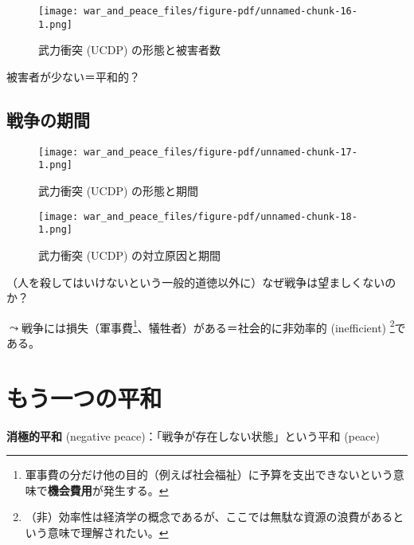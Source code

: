 \documentclass[
  xelatex,
  ja=standard]{bxjsarticle}
\begin{document}
\begin{figure}[htpb]

{\centering \texttt{[image: war\_and\_peace\_files/figure-pdf/unnamed-chunk-16-1.png]}

}

\caption{武力衝突 (UCDP) の形態と被害者数}

\end{figure}

被害者が少ない＝平和的？

\hypertarget{ux6226ux4e89ux306eux671fux9593}{%
\subsection{戦争の期間}\label{ux6226ux4e89ux306eux671fux9593}}

\begin{figure}[htpb]

{\centering \texttt{[image: war\_and\_peace\_files/figure-pdf/unnamed-chunk-17-1.png]}

}

\caption{武力衝突 (UCDP) の形態と期間}

\end{figure}

\begin{figure}[htpb]

{\centering \texttt{[image: war\_and\_peace\_files/figure-pdf/unnamed-chunk-18-1.png]}

}

\caption{武力衝突 (UCDP) の対立原因と期間}

\end{figure}

（人を殺してはいけないという一般的道徳以外に）なぜ戦争は望ましくないのか？

\(\leadsto\)戦争には損失（軍事費\footnote{軍事費の分だけ他の目的（例えば社会福祉）に予算を支出できないという意味で\textbf{機会費用}が発生する。}、犠牲者）がある＝社会的に非効率的
(inefficient) \footnote{（非）効率性は経済学の概念であるが、ここでは無駄な資源の浪費があるという意味で理解されたい。}である。

\hypertarget{ux3082ux3046ux4e00ux3064ux306eux5e73ux548c}{%
\section{もう一つの平和}\label{ux3082ux3046ux4e00ux3064ux306eux5e73ux548c}}

\textbf{消極的平和} (negative peace)：「戦争が存在しない状態」という平和
(peace)
\end{document}
